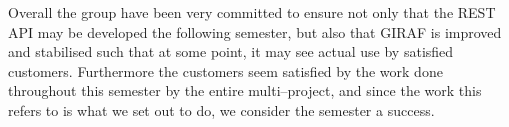 Overall the group have been very committed to ensure not only that the REST API may be developed the following semester, but also that GIRAF is improved and stabilised such that at some point, it may see actual use by satisfied customers.
Furthermore the customers seem satisfied by the work done throughout this semester by the entire multi--project, and since the work this refers to is what we set out to do, we consider the semester a success.